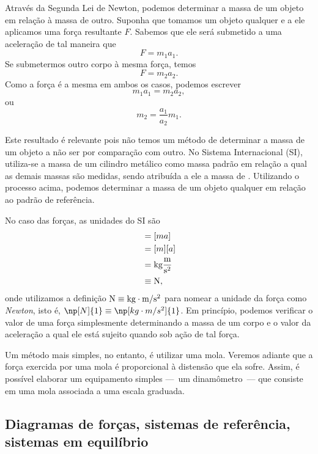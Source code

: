 Através da Segunda Lei de Newton, podemos determinar a massa de um objeto em relação à massa de outro. Suponha que tomamos um objeto qualquer e a ele aplicamos uma força resultante $F$. Sabemos que ele será submetido a uma aceleração de tal maneira que
\begin{equation}
  F = m_1 a_1.
\end{equation}
%
Se submetermos outro corpo à mesma força, temos
\begin{equation}
  F = m_2 a_2.
\end{equation}
%
Como a força é a mesma em ambos os casos, podemos escrever
\begin{equation}
  m_1 a_1 = m_2 a_2,
\end{equation}
%
ou
\begin{equation}
  m_2 = \frac{a_1}{a_2}m_1.
\end{equation}

Este resultado é relevante pois não temos um método de determinar a massa de um objeto a não ser por comparação com outro. No Sistema Internacional (SI), utiliza-se a massa de um cilindro metálico como massa padrão em relação a qual as demais massas são medidas, sendo atribuída a ele a massa de . Utilizando o processo acima, podemos determinar a massa de um objeto qualquer em relação ao padrão de referência.

No caso das forças, as unidades do SI são
\begin{align}
    [F] &= [m a] \\
    &= [m] [a] \\
    &= \rm{kg} \frac{\rm{m}}{\rm{s}^2} \\
    &\equiv \rm{N},
\end{align}
%
onde utilizamos a definição $\rm{N} \equiv \rm{kg}\cdot\rm{m}/\rm{s}^2$ para nomear a unidade da força como \emph{Newton}, isto é, $\np[N]{1} \equiv \np[kg\cdot m/s^2]{1}$. Em princípio, podemos verificar o valor de uma força simplesmente determinando a massa de um corpo e o valor da aceleração a qual ele está sujeito quando sob ação de tal força.

Um método mais simples, no entanto, é utilizar uma mola. Veremos adiante que a força exercida por uma mola é proporcional à distensão que ela sofre. Assim, é possível elaborar um equipamento simples ---~um dinamômetro~--- que consiste em uma mola associada a uma escala graduada.

\subsection{Diagramas de forças, sistemas de referência, sistemas em equilíbrio}
\label{Sec:DiagramaDeForcasESisDeRef}

